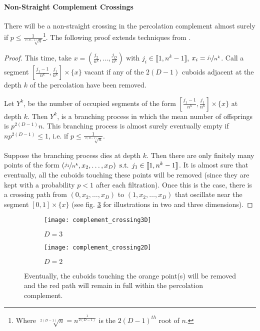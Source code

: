 \paragraph{Non-Straight Complement Crossings}
There will be a non-straight crossing in the percolation complement almost surely if $p \leq \frac{1}{\sqrt[2(D-1)]{n}}$\footnote{Where $\sqrt[2(D-1)]{n} = n^{\frac{1}{2(D-1)}}$ is the $2(D-1)^{th}$ root of $n$.}.
The following proof extends techniques from \cite[p.310 b.(2)]{Chayes_1988}.
\begin{proof}\label{prf:nonStraightComplementCrossigs}
	This time, take $x = \left( \frac{j_2}{n^k},\dots,\frac{j_D}{n^k} \right) \text{ with } j_i \in \llbracket 1,n^k-1 \rrbracket$, $x_i = \nicefrac{j_i}{n^k}$.
	Call a segment $\left[ \frac{j_1-1}{n^k},\frac{j_1}{n^k} \right] \times \{ x \}$ vacant if any of the $2(D-1)$ cuboids adjacent at the depth $k$ of the percolation have been removed.
	
	Let $Y^k$, be the number of occupied segments of the form $\left[ \frac{j_1-1}{n^k},\frac{j_1}{n^k} \right] \times \{ x \}$ at depth $k$.
	Then $Y^k$, is a branching process in which the mean number of offsprings is $p^{2(D-1)}n$.
	This branching process is almost surely eventually empty if $np^{2(D-1)} \leq 1$, i.e. if $p \leq \frac{1}{\sqrt[2(D-1)]{n}}$.
	
	Suppose the branching process dies at depth $k$.
	Then there are only finitely many points of the form $\left( \nicefrac{j_1}{n^k}, x_2,\dots,x_D \right) \text{ s.t. } j_1 \in \llbracket 1,n^k-1 \rrbracket$.
	It is almost sure that eventually, all the cuboids touching these points will be removed (since they are kept with a probability $p<1$ after each filtration).
	Once this is the case, there is a crossing path from $\left( 0, x_2,\dots,x_D \right)$ to $\left( 1, x_2,\dots,x_D \right)$ that oscillate near the segment $\left[ 0,1 \right] \times \{ x \}$ (see fig. \ref{fig:complementCrossing} for illustrations in two and three dimensions).
\end{proof}

\begin{figure}[!h]
	\vspace{-0.75cm}
	\begin{subfigure}{0.44\linewidth}
		\texttt{[image: complement\_crossing3D]}
		\centering
		\captionsetup{justification=centering}
		\caption{$D = 3$}
		\label{fig:complementCrossing3D}
	\end{subfigure}
	\hspace{0.1\linewidth}
	\begin{subfigure}{0.44\linewidth}
		\texttt{[image: complement\_crossing2D]}
		\centering
		\captionsetup{justification=centering}
		\caption{$D = 2$}
		\label{fig:complementCrossing2D}
	\end{subfigure}
	\centering
	\caption{Eventually, the cuboids touching the orange point(s) will be removed and the red path will remain in full within the percolation complement.}
	\label{fig:complementCrossing}
\end{figure}

